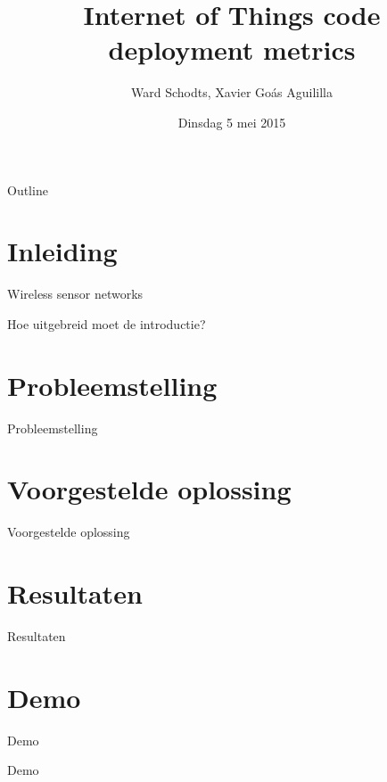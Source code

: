 \documentclass[presentation, bigger]{beamer}
\author{Ward Schodts, Xavier Goás Aguililla}
\date{Dinsdag 5 mei 2015}
\title{Internet of Things code deployment metrics}
\begin{document}
\maketitle
\begin{frame}[noframenumbering]{Outline}
  \tableofcontents
\end{frame}



\section{Inleiding}
\label{sec-1}
\begin{frame}[label=sec-1-1]{Wireless sensor networks}

Hoe uitgebreid moet de introductie?
\end{frame}


\section{Probleemstelling}
\label{sec-2}
\begin{frame}[label=sec-2-1]{Probleemstelling}

\end{frame}

\section{Voorgestelde oplossing}
\label{sec-3}

\begin{frame}[label=sec-1-7]{Voorgestelde oplossing}

\end{frame}

\section{Resultaten}
\begin{frame}[label=sec-3-3]{Resultaten}

\end{frame}

\section{Demo}
\begin{frame}{Demo}
\begin{center}
\Huge{Demo}
\end{center}
\end{frame}
\end{document}
